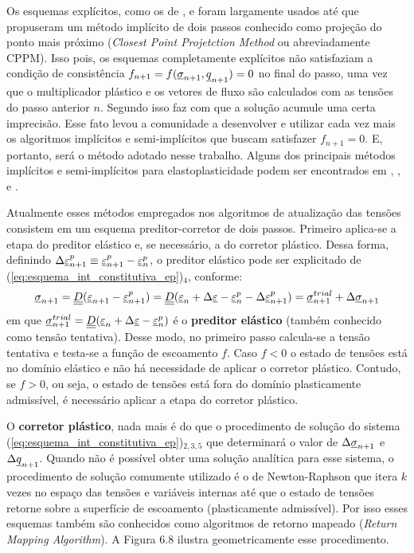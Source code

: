 Os esquemas explícitos, como os de ,  e  foram largamente usados até que  propuseram um método implícito de dois passos conhecido como projeção do ponto mais próximo (\textit{Closest Point Projetction Method} ou abreviadamente CPPM). Isso pois, os esquemas completamente explícitos não satisfaziam a condição de consistência $f_{n+1} = f(\underline \sigma_{n+1},\underline q_{n+1}) = 0$ no final do passo, uma vez que o multiplicador plástico e os vetores de fluxo são calculados com as tensões do passo anterior $n$. Segundo  isso faz com que a solução acumule uma certa imprecisão. Esse fato levou a comunidade a desenvolver e utilizar cada vez mais os algoritmos implícitos e semi-implícitos que buscam satisfazer $f_{n+1} = 0$. E, portanto, será o método adotado nesse trabalho. Alguns dos principais métodos implícitos e semi-implícitos para elastoplasticidade podem ser encontrados em , ,  e .

Atualmente esses métodos empregados nos algoritmos de atualização das tensões consistem em um esquema preditor-corretor de dois passos. Primeiro aplica-se a etapa do preditor elástico e, se necessário, a do corretor plástico. Dessa forma, definindo $\Delta \underline{\varepsilon}_{n+1}^p \equiv \underline{\varepsilon}_{n+1}^p - \underline{\varepsilon}_{n}^p$, o preditor elástico pode ser explicitado de (\ref{eq:esquema_int_constitutiva_ep})$_4$, conforme:
\begin{equation}
	\label{eq:preditor_elastico}
	\underline \sigma_{n+1} = \underline{\underline D}(\underline{\varepsilon}_{n+1}-\underline{\varepsilon}_{n+1}^p) = \underline{\underline D}(\underline{\varepsilon}_n+\Delta \underline{\varepsilon}-\underline{\varepsilon}_{n}^ p-\Delta \underline{\varepsilon}_{n+1}^p) = \underline \sigma_{n+1}^{trial} + \Delta \underline \sigma_{n+1}
\end{equation}
em que $\underline \sigma_{n+1}^{trial} = \underline{\underline D}(\underline{\varepsilon}_n+\Delta \underline{\varepsilon}-\underline{\varepsilon}_{n}^ p)$ é o \textbf{preditor elástico} (também conhecido como tensão tentativa). Desse modo, no primeiro passo calcula-se a tensão tentativa e testa-se a função de escoamento $f$. Caso $f<0$ o estado de tensões está no domínio elástico e não há necessidade de aplicar o corretor plástico. Contudo, se $f>0$, ou seja, o estado de tensões está fora do domínio plasticamente admissível, é necessário aplicar a etapa do corretor plástico.

O \textbf{corretor plástico}, nada mais é do que o procedimento de solução do sistema (\ref{eq:esquema_int_constitutiva_ep})$_{2,3,5}$ que determinará o valor de $\Delta \underline \sigma_{n+1}$ e $\Delta \underline q_{n+1}$. Quando não é possível obter uma solução analítica para esse sistema, o procedimento de solução comumente utilizado é o de Newton-Raphson que itera $k$ vezes no espaço das tensões e variáveis internas até que o estado de tensões retorne sobre a superfície de escoamento (plasticamente admissível). Por isso esses esquemas também são conhecidos como algoritmos de retorno mapeado (\textit{Return Mapping Algorithm}). A Figura 6.8 ilustra geometricamente esse procedimento.

